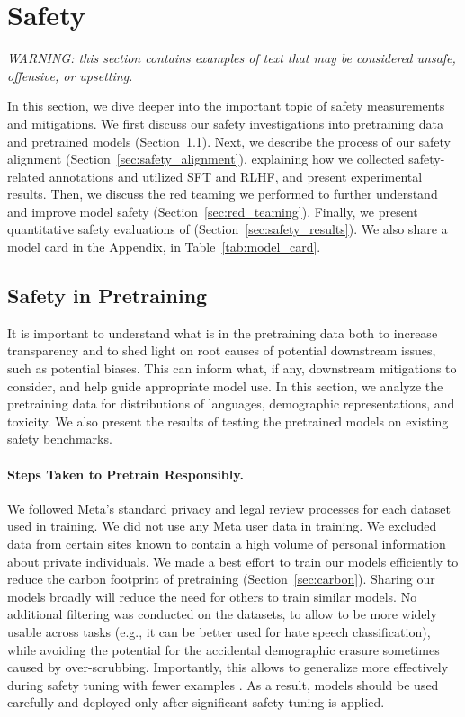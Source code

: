\section{Safety}
\label{sec:safety_section}


{\color{olive}\textit{WARNING: this section contains examples of text that may be considered unsafe, offensive, or upsetting.}}

In this section, we dive deeper into the important topic of safety measurements and mitigations. We first discuss our safety investigations into pretraining data and pretrained models (Section~\ref{sec:safety_data}).
Next, we describe the process of our safety alignment (Section~\ref{sec:safety_alignment}), explaining how we collected safety-related annotations and utilized SFT and RLHF, and present experimental results. Then, we discuss the red teaming we performed to further understand and improve model safety (Section~\ref{sec:red_teaming}). 
Finally, we present quantitative safety evaluations of \modelname (Section~\ref{sec:safety_results}). We also share a model card in the Appendix, in Table~\ref{tab:model_card}.


\subsection{Safety in Pretraining}
\label{sec:safety_data}
It is important to understand what is in the pretraining data both to increase transparency and to shed light on root causes of potential downstream issues, such as potential biases. This can inform what, if any, downstream mitigations to consider, and help guide appropriate model use. In this section, we analyze the pretraining data for distributions of languages, demographic representations, and toxicity. We also present the results of testing the pretrained models on existing safety benchmarks.

\paragraph{Steps Taken to Pretrain Responsibly.} We followed Meta's standard privacy and legal review processes for each dataset used in training. We did not use any Meta user data in training. We excluded data from certain sites known to contain a high volume of personal information about private individuals. We made a best effort to train our models efficiently to reduce the carbon footprint of pretraining (Section~\ref{sec:carbon}). Sharing our models broadly will reduce the need for others to train similar models. No additional filtering was conducted on the datasets, to allow \cinnamon to be more widely usable across tasks (e.g., it can be better used for hate speech classification), while avoiding the potential for the accidental demographic erasure sometimes caused by over-scrubbing. Importantly, this allows \modelname to generalize more effectively during safety tuning with fewer examples \citep{welbl2021challenges, korbak2023pretraining, xu2021recipes}. As a result, \cinnamon models should be used carefully and deployed only after significant safety tuning is applied.


